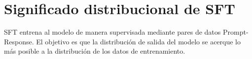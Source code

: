 \section{Significado distribucional de SFT}
SFT entrena al modelo de manera supervisada mediante pares de datos Prompt-Response. El objetivo es que la distribución de salida del modelo se acerque lo más posible a la distribución de los datos de entrenamiento.

